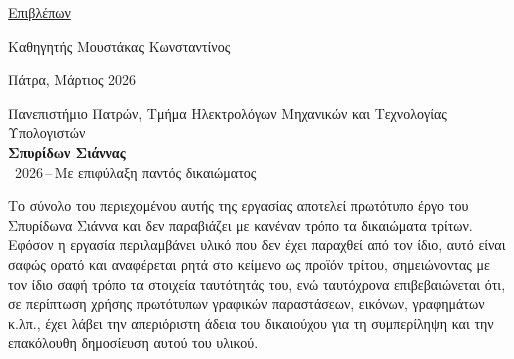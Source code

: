 \begin{titlepage}
\vspace{1.0em}

{\normalsize{}\underline{Επιβλέπων}}

\vspace{0.4em}

{\normalsize{}Καθηγητής Μουστάκας Κωνσταντίνος}

\vspace{0.5em}

{\normalsize{}Πάτρα, Μάρτιος 2026}

\end{titlepage}

\cleardoublepage
\thispagestyle{empty}
\vspace*{3cm}


\begin{center}
  {\normalsize Πανεπιστήμιο Πατρών, Τμήμα Ηλεκτρολόγων Μηχανικών και Τεχνολογίας Υπολογιστών}\\[0.5em]
  {\large\bfseries Σπυρίδων Σιάννας}\\[0.5em]
  {\normalsize \textcopyright\ 2026\,--\,Με επιφύλαξη παντός δικαιώματος}
\end{center}

\vspace{2em}

\noindent Το σύνολο του περιεχομένου αυτής της εργασίας αποτελεί πρωτότυπο έργο του
Σπυρίδωνα Σιάννα και δεν παραβιάζει με κανέναν τρόπο τα δικαιώματα τρίτων.
Εφόσον η εργασία περιλαμβάνει υλικό που δεν έχει παραχθεί από τον ίδιο, αυτό είναι
σαφώς ορατό και αναφέρεται ρητά στο κείμενο ως προϊόν τρίτου, σημειώνοντας με τον ίδιο
σαφή τρόπο τα στοιχεία ταυτότητάς του, ενώ ταυτόχρονα επιβεβαιώνεται ότι, σε περίπτωση
χρήσης πρωτότυπων γραφικών παραστάσεων, εικόνων, γραφημάτων κ.λπ., έχει λάβει την
απεριόριστη άδεια του δικαιούχου για τη συμπερίληψη και την επακόλουθη δημοσίευση
αυτού του υλικού.


\cleardoublepage
\thispagestyle{empty}
\vspace*{1.5cm}

